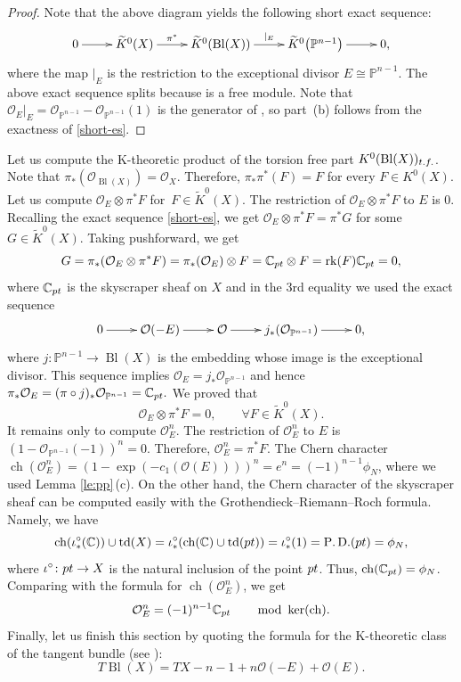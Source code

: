 \documentclass[10pt,a4paper]{article}
\numberwithin{equation}{section}
\newcommand{\CC}{\mathbb{C}}
\newcommand{\ZZ}{\mathbb{Z}}
\newcommand{\PP}{\mathbb{P}}
\renewcommand{\O}{\mathcal{O}}
\begin{document}
\begin{proof}
Note that the above diagram yields the following short exact sequence:
\begin{equation}\label{short-es}
\xymatrix{
 0\ar[r] &
 \widetilde{K}^0(X)\ar[r]^-{\pi^*} &
 \widetilde{K}^0(\operatorname{Bl}(X)) \ar[r]^-{|_E} &
 \widetilde{K}^0\big(\PP^{n-1}\big)\ar[r] & 0, }
\end{equation}
where the map $|_E$ is the restriction to the exceptional divisor
$E\cong \PP^{n-1}$. The above exact sequence splits because \smash{$\widetilde{K}^0\big(\PP^{n-1}\big)\cong \ZZ^{n-1}$} is a free module. Note that
$\O_E|_E = \O_{\PP^{n-1}}-\O_{\PP^{n-1}}(1)$ is the generator of
\smash{$\widetilde{K}^0\big(\PP^{n-1}\big)$}, so part~(b) follows from the exactness of
\eqref{short-es}.
\end{proof}

Let us compute the K-theoretic product of the torsion free part $K^0(\operatorname{Bl}(X))_{\rm t.f.}$. Note that
$\pi_*(\O_{\operatorname{Bl}(X)})=\O_X$. Therefore, $\pi_*\pi^*(F)=F$ for
every $F\in K^0(X)$. Let us compute $\O_E\otimes \pi^*F$ for~$F\in \widetilde{K}^0(X)$. The
restriction of $\O_E\otimes \pi^*F$ to $E$ is 0. Recalling the exact sequence
\eqref{short-es}, we get $\O_E\otimes \pi^*F=\pi^*G$ for some $G\in
\widetilde{K}^0(X)$. Taking pushforward, we get
\[
G=\pi_*(\O_E\otimes \pi^*F) = \pi_*(\O_E)\otimes F =
\CC_{{\rm pt}}\otimes F = \operatorname{rk}(F)
\CC_{{\rm pt}} =0,
\]
where $\CC_{{\rm pt}}$ is the skyscraper sheaf on $X$ and in the
3rd equality we used the exact sequence
\[
\xymatrix{
0\ar[r] & \O(-E)\ar[r] &\O \ar[r] & j_*(\O_{\PP^{n-1}}) \ar[r] & 0,}
\]
where $j\colon\PP^{n-1}\to \operatorname{Bl}(X)$ is the embedding whose image
is the exceptional divisor. This sequence implies
$\O_E=j_*\O_{\PP^{n-1}}$ and hence $\pi_* \O_E=
(\pi\circ j)_*\O_{\PP^{n-1}} = \CC_{{\rm pt}}.$ We proved
that
\[
\O_E\otimes \pi^*F=0,\qquad \forall F\in \widetilde{K}^0(X).
\]
It remains only to compute $\O_E^n$. The restriction of $\O_E^n$ to
$E$ is $(1-\O_{\PP^{n-1}}(-1))^n = 0$. Therefore, $\O_E^n =\pi^*
F$. The Chern character $\operatorname{ch}(\O_E^n) =
(1-\exp(-c_1(\O(E))) )^n = e^n = (-1)^{n-1} \phi_N$, where we used
Lemma \ref{le:pp}\,(c). On the other hand, the Chern character of
the skyscraper sheaf can be computed easily with the Grothendieck--Riemann--Roch
formula. Namely, we have
\[
\operatorname{ch}(\iota^\circ_*(\CC) )\cup \operatorname{td}(X) =
\iota^\circ_* (\operatorname{ch}(\CC)\cup \operatorname{td}({\rm pt}))
=
\iota^\circ_* (1) = \operatorname{P.D.}({\rm pt}) = \phi_N,
\]
where $\iota^\circ\colon {\rm pt}\to X$ is the natural inclusion of the point
${\rm pt}$. Thus, %
$\operatorname{ch}(\CC_{{\rm pt}}) = \phi_N$. Comparing with the
formula for $\operatorname{ch}(\O_E^n) $, we get
\[
\O_E^n = (-1)^{n-1} \CC_{{\rm pt}}\qquad
\operatorname{mod} \ \operatorname{ker}(\operatorname{ch}).
\]
Finally, let us finish this section by quoting the formula for the
K-theoretic class of the tangent bundle (see \cite[Lemma 15.4]{Fu}):
\[%
T\operatorname{Bl}(X) = TX-n-1 + n \O(-E)+\O(E).
\]
\end{document}
